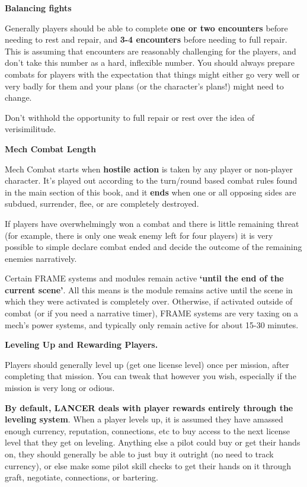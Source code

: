 \begin{center}
     \textbf{Balancing fights}
\end{center}

Generally players should be able to complete \textbf{one or two encounters} before needing to rest and
repair, and \textbf{3-4 encounters} before needing to full repair. This is assuming that encounters are
reasonably challenging for the players, and don’t take this number as a hard, inflexible number.
You should always prepare combats for players with the expectation that things might either go
very well or very badly for them and your plans (or the character’s plans!) might need to change.

Don’t withhold the opportunity to full repair or rest over the idea of verisimilitude.

\begin{center}
     \textbf{Mech Combat Length}
\end{center}

Mech Combat starts when \textbf{hostile action} is taken by any player or non-player character. It’s
played out according to the turn/round based combat rules found in the main section of this
book, and it \textbf{ends} when one or all opposing sides are subdued, surrender, flee, or are completely
destroyed.

If players have overwhelmingly won a combat and there is little remaining threat (for example,
there is only one weak enemy left for four players) it is very possible to simple declare combat
ended and decide the outcome of the remaining enemies narratively.

Certain FRAME systems and modules remain active \textbf{‘until the end of the current scene’}. All this
means is the module remains active until the scene in which they were activated is completely
over. Otherwise, if activated outside of combat (or if you need a narrative timer), FRAME systems
are very taxing on a mech’s power systems, and typically only remain active for about 15-30
minutes.

\begin{center}
\textbf{Leveling Up and Rewarding Players.}
\end{center}

Players should generally level up (get one license level) once per mission, after completing that
mission. You can tweak that however you wish, especially if the mission is very long or odious.

\textbf{By default, LANCER deals with player rewards entirely through the leveling system}. When a
player levels up, it is assumed they have amassed enough currency, reputation, connections, etc
to buy access to the next license level that they get on leveling. Anything else a pilot could buy
or get their hands on, they should generally be able to just buy it outright (no need to track
currency), or else make some pilot skill checks to get their hands on it through graft, negotiate,
connections, or bartering.


